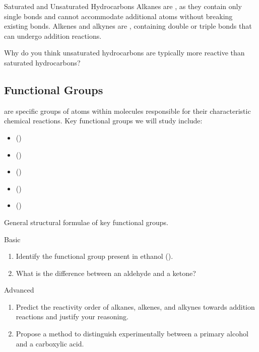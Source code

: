 \begin{keyconcept}{Saturated and Unsaturated Hydrocarbons}
Alkanes are , as they contain only single bonds and cannot accommodate additional atoms without breaking existing bonds. Alkenes and alkynes are , containing double or triple bonds that can undergo addition reactions.
\end{keyconcept}

\begin{stopandthink}
Why do you think unsaturated hydrocarbons are typically more reactive than saturated hydrocarbons?
\end{stopandthink}

\subsection{Functional Groups}
\FloatBarrier
\FloatBarrier
\FloatBarrier

 are specific groups of atoms within molecules responsible for their characteristic chemical reactions. Key functional groups we will study include:

\begin{itemize}
    \item {} ()
    \item {} ()
    \item {} ()
    \item {} ()
    \item {} ()
\end{itemize}

\begin{marginfigure}[0pt][0pt][0pt]
    \caption{General structural formulae of key functional groups.}
\end{marginfigure}

\begin{tieredquestions}{Basic}
\begin{enumerate}
    \item Identify the functional group present in ethanol ().
    \item What is the difference between an aldehyde and a ketone?
\end{enumerate}
\end{tieredquestions}

\begin{tieredquestions}{Advanced}
\begin{enumerate}
    \item Predict the reactivity order of alkanes, alkenes, and alkynes towards addition reactions and justify your reasoning.
    \item Propose a method to distinguish experimentally between a primary alcohol and a carboxylic acid.
\end{enumerate}
\end{tieredquestions}


